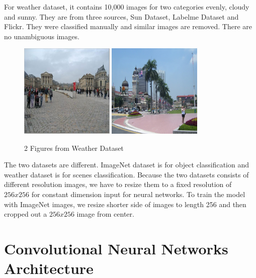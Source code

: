 For weather dataset, it contains 10,000 images for two categories evenly, cloudy and sunny. They are from three sources, Sun Dataset\citep{russell2008labelme}, Labelme Dataset\citep{xiao2010sun} and Flickr. They were classified manually and similar images are removed. There are no unambiguous images.
\graphicspath{ {./Figures/} }
\begin{figure}[!htb]
    \centering
	\includegraphics[width=0.4\textwidth]{cloudy_0001.png}
    \qquad
    \includegraphics[width=0.4\textwidth]{sunny_0003.png}
    \caption{2 Figures from Weather Dataset}%
    \label{fig:WeatherExamples}%
\end{figure}

The two datasets are different. ImageNet dataset is for object classification and weather dataset is for scenes classification. Because the two datasets consists of different resolution images, we have to resize them to a fixed resolution of $256x256$ for constant dimension input for neural networks. To train the model with ImageNet images, we resize shorter side of images to length 256 and then cropped out a $256x256$ image from center.


\section{Convolutional Neural Networks Architecture}

